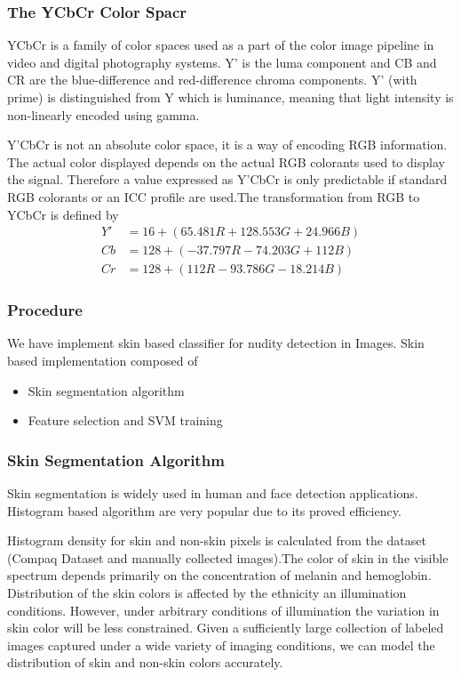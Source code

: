 \subsubsection{The YCbCr Color Spacr}
YCbCr is a family of color spaces used as a part of the color image pipeline in video and digital photography systems. Y' is the luma component and CB and CR are the blue-difference and red-difference chroma  components. Y' (with prime) is distinguished from Y which is luminance, meaning that light intensity is non-linearly encoded using gamma.

Y'CbCr is not an absolute color space, it is a way of encoding RGB information.
The actual color displayed depends on the actual RGB colorants used to display the signal. Therefore a value expressed as Y'CbCr is only predictable if standard RGB colorants or an ICC profile are used.The transformation from RGB to YCbCr is defined by
\begin{align}
Y'&=16+ (65.481R + 128.553G + 24.966B)\\
Cb&=128+(-37.797R- 74.203G +112B)\\
Cr&=128+(112R -93.786G - 18.214B)
\end{align}
%

\subsubsection{Procedure}

We have implement skin based classifier for nudity detection in Images. Skin based implementation composed of
\begin{itemize}
\item Skin segmentation algorithm

\item  Feature selection and SVM training
\end{itemize}

\subsubsection{Skin Segmentation Algorithm}
Skin segmentation is widely used in human and face detection applications. Histogram based algorithm are very popular due to its proved efficiency.

Histogram density for skin and non-skin pixels is calculated from the dataset (Compaq Dataset and manually collected images).The color of skin in the visible spectrum depends primarily on the concentration of melanin and hemoglobin. Distribution of the skin colors is affected by the ethnicity an illumination conditions. However, under arbitrary conditions of illumination the variation in skin color will be less constrained. Given a sufficiently large collection of labeled images captured under a wide variety of imaging conditions, we can model the distribution of skin and non-skin colors accurately.

